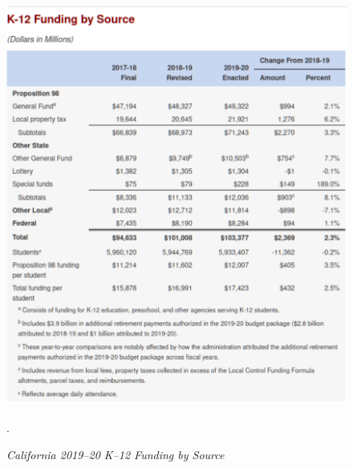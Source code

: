 \begin{figure}
  \centering
  \caption[California 2019–20 K–12 Funding by Source]{\textit{California 2019–20 K–12 Funding by Source}}\label{fig:2019–20_K–12_Funding}
  \includegraphics[width=\textwidth]{2019-20_K-12_Funding_by_Source.pdf}\\ %
  \footnotesize\raggedright\textcite{LAO2021}.
\end{figure}

